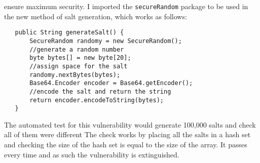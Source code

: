 ensure maximum security. I imported the \verb|secureRandom| package to be used in the new method of salt generation, which works as follows:
\begin{verbatim}
   public String generateSalt() {
       SecureRandom randomy = new SecureRandom();
       //generate a random number
       byte bytes[] = new byte[20];
       //assign space for the salt
       randomy.nextBytes(bytes);
       Base64.Encoder encoder = Base64.getEncoder();
       //encode the salt and return the string
       return encoder.encodeToString(bytes);
   }
\end{verbatim}
The automated test for this vulnerability would generate 100,000 salts and check all of them were different The check works by placing all the salts in a hash set and checking the
size of the hash set is equal to the size of the array. It passes every time and as such the vulnerability is extinguished.
